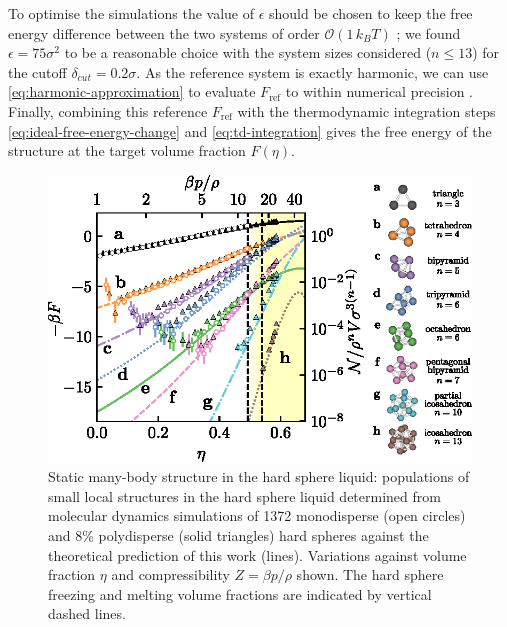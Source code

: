 \documentclass[11pt,twoside]{report}
\begin{document}
To optimise the simulations the value of $\epsilon$ should be chosen to keep the free energy difference between the two systems of order $\mathcal{O}(1 \, k_B T)$ \cite{SchillingJCP2009}; we found $\epsilon = 75\sigma^2$ to be a reasonable choice with the system sizes considered ($n \le 13$) for the cutoff $\delta_{cut} = 0.2\sigma$.
As the reference system is exactly harmonic, we can use \eqref{eq:harmonic-approximation} to evaluate $F_\mathrm{ref}$ to within numerical precision%
.
Finally, combining this reference $F_\mathrm{ref}$ with the thermodynamic integration steps \eqref{eq:ideal-free-energy-change} and \eqref{eq:td-integration} gives the free energy of the structure at the target volume fraction $F(\eta)$.

\begin{figure}
  \includegraphics[width=\linewidth,center]{structure-populations}
  \caption[Concentration of local structures in the equilibrium liquid]{
    Static many-body structure in the hard sphere liquid: populations of small local structures in the hard sphere liquid determined from molecular dynamics simulations of 1372 monodisperse (open circles) and 8\% polydisperse (solid triangles) hard spheres against the theoretical prediction of this work (lines).
    Variations against volume fraction $\eta$ and compressibility $Z = \beta p/\rho$ shown.
    The hard sphere freezing and melting volume fractions are indicated by vertical dashed lines.
  }
  \label{fig:structure-populations}
\end{figure}
\end{document}
